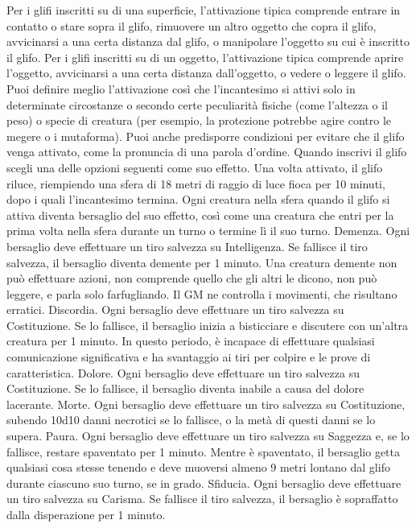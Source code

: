 \begin{multicols}{2}
Per i glifi inscritti su di una superficie, l’attivazione tipica
comprende entrare in contatto o stare sopra il glifo,
rimuovere un altro oggetto che copra il glifo, avvicinarsi
a una certa distanza dal glifo, o manipolare l’oggetto su
cui è inscritto il glifo.
Per i glifi inscritti su di un oggetto, l’attivazione tipica
comprende aprire l’oggetto, avvicinarsi a una certa
distanza dall’oggetto, o vedere o leggere il glifo.
Puoi definire meglio l’attivazione così che l’incantesimo
si attivi solo in determinate circostanze o secondo certe
peculiarità fisiche (come l’altezza o il peso) o specie di
creatura (per esempio, la protezione potrebbe agire
contro le megere o i mutaforma). Puoi anche
predisporre condizioni per evitare che il glifo venga
attivato, come la pronuncia di una parola d’ordine.
Quando inscrivi il glifo scegli una delle opzioni seguenti
come suo effetto. Una volta attivato, il glifo riluce,
riempiendo una sfera di 18 metri di raggio di luce fioca
per 10 minuti, dopo i quali l’incantesimo termina. Ogni
creatura nella sfera quando il glifo si attiva diventa
bersaglio del suo effetto, così come una creatura che
entri per la prima volta nella sfera durante un turno o
termine lì il suo turno.
Demenza. Ogni bersaglio deve effettuare un tiro
salvezza su Intelligenza. Se fallisce il tiro salvezza, il
bersaglio diventa demente per 1 minuto. Una creatura
demente non può effettuare azioni, non comprende
quello che gli altri le dicono, non può leggere, e parla
solo farfugliando. Il GM ne controlla i movimenti, che
risultano erratici.
Discordia. Ogni bersaglio deve effettuare un tiro
salvezza su Costituzione. Se lo fallisce, il bersaglio
inizia a bisticciare e discutere con un’altra creatura per
1 minuto. In questo periodo, è incapace di effettuare
qualsiasi comunicazione significativa e ha svantaggio ai
tiri per colpire e le prove di caratteristica.
Dolore. Ogni bersaglio deve effettuare un tiro salvezza
su Costituzione. Se lo fallisce, il bersaglio diventa
inabile a causa del dolore lacerante.
Morte. Ogni bersaglio deve effettuare un tiro salvezza
su Costituzione, subendo 10d10 danni necrotici se lo
fallisce, o la metà di questi danni se lo supera.
Paura. Ogni bersaglio deve effettuare un tiro salvezza
su Saggezza e, se lo fallisce, restare spaventato per 1
minuto. Mentre è spaventato, il bersaglio getta qualsiasi
cosa stesse tenendo e deve muoversi almeno 9 metri
lontano dal glifo durante ciascuno suo turno, se in
grado.
Sfiducia. Ogni bersaglio deve effettuare un tiro
salvezza su Carisma. Se fallisce il tiro salvezza, il
bersaglio è sopraffatto dalla disperazione per 1 minuto.

\end{multicols}
